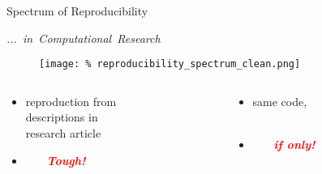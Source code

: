 \begin{frame}{Spectrum of Reproducibility}

  \begin{flushright}
    \Large\mbox{\textit{... in Computational Research}}
  \end{flushright}
  \vspace{0.3cm} \normalsize

  \begin{figure}
    \texttt{[image: \%
      reproducibility\_spectrum\_clean.png]}
  \end{figure}

  \large
  \begin{columns}[t]
    \begin{column}[t]{0.4\textwidth} 
      \begin{itemize}
        \item[] reproduction from\\ descriptions in\\ research article
      \end{itemize}
      \vspace{0.2cm}

      \begin{itemize}
        \item[] \textcolor{white}{-----}%
          \Large\textcolor{red}{\textbf{\emph{Tough!}}}
      \end{itemize}
      \large      
    \end{column}
    \hfill
    \begin{column}[t]{0.45\textwidth} 
      \begin{itemize}
        \item[] same code,\\%
          \textcolor{white}{-----}\\%
      \end{itemize}

      \vspace{0.2cm}

      \begin{itemize}
      \item[]  \textcolor{white}{-----} 
          \textcolor{red}{\textbf{\emph{if only!}}}
      \end{itemize}

    \end{column}
  \end{columns}

  \vspace{1cm}

\end{frame}


